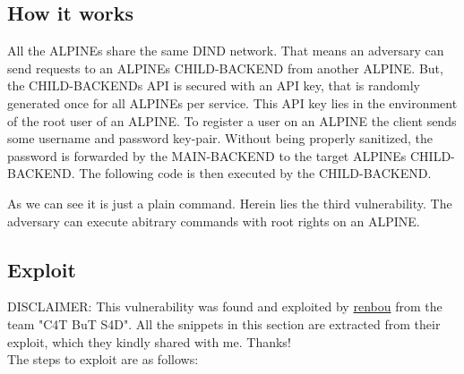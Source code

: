 \documentclass[10pt]{article}
\begin{document}
\subsection{How it works}

All the ALPINEs share the same DIND network. That means an adversary can send requests to an ALPINEs CHILD-BACKEND from another ALPINE. But, the CHILD-BACKENDs API is secured with an API key, that is randomly generated once for all ALPINEs per service. This API key lies in the environment of the root user of an ALPINE. To register a user on an ALPINE the client sends some username and password key-pair. Without being properly sanitized, the password is forwarded by the MAIN-BACKEND to the target ALPINEs CHILD-BACKEND. The following code is then executed by the CHILD-BACKEND.



As we can see it is just a plain  command. Herein lies the third vulnerability. The adversary can execute abitrary  commands with root rights on an ALPINE.

\subsection{Exploit}

DISCLAIMER: This vulnerability was found and exploited by \href{https://ctftime.org/user/65650}{renbou} from the team "C4T BuT S4D". All the snippets in this section are extracted from their exploit, which they kindly shared with me. Thanks! \\

The steps to exploit are as follows:
\end{document}

